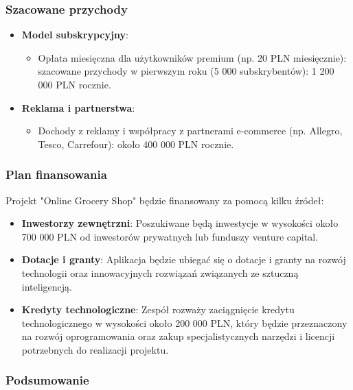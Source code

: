 \documentclass[12pt,a4paper]{article}
\begin{document}
\subsubsection*{Szacowane przychody}

\begin{itemize} 

\item \textbf{Model subskrypcyjny}: 
\begin{itemize} 
	\item Opłata miesięczna dla użytkowników premium (np. 20 PLN miesięcznie): szacowane przychody w pierwszym roku (5 000 subskrybentów): 1 200 000 PLN rocznie. 
\end{itemize}

\item \textbf{Reklama i partnerstwa}: 
\begin{itemize}
    \item Dochody z reklamy i współpracy z partnerami e-commerce (np. Allegro, Tesco, Carrefour): około 400 000 PLN rocznie.
\end{itemize}

\end{itemize}

\subsubsection*{Plan finansowania}

Projekt "Online Grocery Shop" będzie finansowany za pomocą kilku źródeł:

\begin{itemize} 
	\item \textbf{Inwestorzy zewnętrzni}: Poszukiwane będą inwestycje w wysokości około 700 000 PLN od inwestorów prywatnych lub funduszy venture capital. 
	\item \textbf{Dotacje i granty}: Aplikacja będzie ubiegać się o dotacje i granty na rozwój technologii oraz innowacyjnych rozwiązań związanych ze sztuczną inteligencją. 
	\item \textbf{Kredyty technologiczne}: Zespół rozważy zaciągnięcie kredytu technologicznego w wysokości około 200 000 PLN, który będzie przeznaczony na rozwój oprogramowania oraz zakup specjalistycznych narzędzi i licencji potrzebnych do realizacji projektu.
\end{itemize}

\subsubsection*{Podsumowanie}
\end{document}

